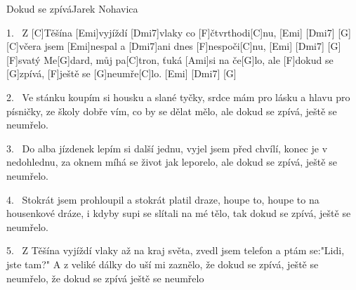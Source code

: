 \begin{song}{Dokud se zpívá}{Jarek Nohavica}

\begin{xverse}{1.~}
Z [\large C]Těšína [\large Emi]vyjíždí [\large Dmi7]vlaky co [\large F]{}čtvrthodi[\large C]nu, [\large Emi]{\qquad} [\large Dmi7]{\qquad} [\large G]{\qquad}
[\large C]včera jsem [\large Emi]nespal a [\large Dmi7]ani dnes [\large F]nespoči[\large C]nu,  [\large Emi]{\qquad} [\large Dmi7]{\qquad} [\large G]{\qquad}
[\large F]svatý Me[\large G]dard, můj pa[\large C]tron, ťuká [\large Ami]si na če[\large G]lo,
ale [\large F]dokud se [\large G]zpívá, [\large F]ještě se [\large G]neumře[\large C]lo.  [\large Emi]{\qquad} [\large Dmi7]{\qquad} [\large G]{\qquad}
\end{xverse}

\begin{xverse}{2.~}
Ve stánku koupím si housku a slané tyčky,
srdce mám pro lásku a hlavu pro písničky,
ze školy dobře vím, co by se dělat mělo,
ale dokud se zpívá, ještě se neumřelo.
\end{xverse}

\begin{xverse}{3.~}
Do alba jízdenek lepím si další jednu,
vyjel jsem před chvílí, konec je v nedohlednu,
za oknem míhá se život jak leporelo,
ale dokud se zpívá, ještě se neumřelo.
\end{xverse}

\begin{xverse}{4.~}
Stokrát jsem prohloupil a stokrát platil draze,
houpe to, houpe to na housenkové dráze,
i kdyby supi se slítali na mé tělo,
tak dokud se zpívá, ještě se neumřelo.
\end{xverse}

\begin{xverse}{5.~}
Z Těšína vyjíždí vlaky až na kraj světa,
zvedl jsem telefon a ptám se:"Lidi, jste tam?"
A z veliké dálky do uší mi zaznělo,
že dokud se zpívá, ještě se neumřelo,
že dokud se zpívá ještě se neumřelo
\end{xverse}

\end{song}
\chords{\chordDmiSeven}


